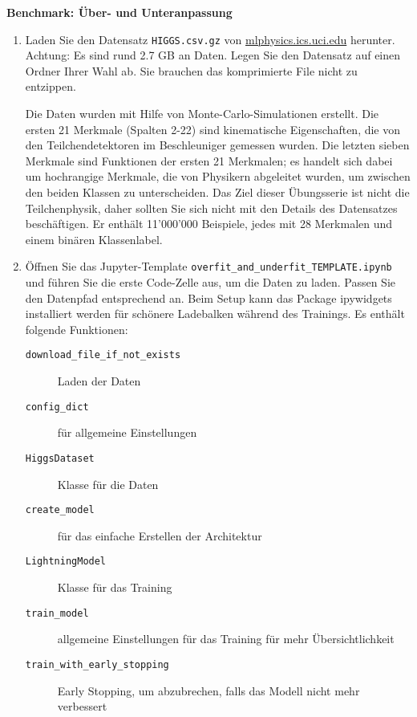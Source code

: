 \documentclass[11pt,a4paper,headinclude]{scrartcl}
\begin{document}
\begin{Aufgabe} \textbf{Benchmark: Über- und Unteranpassung}
	\label{ex:preprocessing}

	
	\begin{enumerate}
		\item Laden Sie den Datensatz \texttt{HIGGS.csv.gz} von \href{http://mlphysics.ics.uci.edu/data/higgs/}{mlphysics.ics.uci.edu} herunter. Achtung: Es sind rund 2.7 GB an Daten. Legen Sie den Datensatz auf einen Ordner Ihrer Wahl ab. Sie brauchen das komprimierte File nicht zu entzippen.
		
		Die Daten wurden mit Hilfe von Monte-Carlo-Simulationen erstellt. Die ersten 21 Merkmale (Spalten 2-22) sind kinematische Eigenschaften, die von den Teilchendetektoren im Beschleuniger gemessen wurden. Die letzten sieben Merkmale sind Funktionen der ersten 21 Merkmalen; es handelt sich dabei um hochrangige Merkmale, die von Physikern abgeleitet wurden, um zwischen den beiden Klassen zu unterscheiden. Das Ziel dieser Übungsserie ist nicht die Teilchenphysik, daher sollten Sie sich nicht mit den Details des Datensatzes beschäftigen. Er enthält 11'000'000 Beispiele, jedes mit 28 Merkmalen und einem binären Klassenlabel.
		
				
		\item Öffnen Sie das Jupyter-Template \texttt{overfit\_and\_underfit\_TEMPLATE.ipynb} und führen Sie die erste Code-Zelle aus, um die Daten zu laden. Passen Sie den Datenpfad entsprechend an. Beim Setup kann das Package ipywidgets installiert werden für schönere Ladebalken während des Trainings. Es enthält folgende Funktionen:
		\begin{description}
			\item[\texttt{download\_file\_if\_not\_exists}] Laden der Daten
			\item[\texttt{config\_dict}] für allgemeine Einstellungen
			\item[\texttt{HiggsDataset}] Klasse für die Daten
			\item[\texttt{create\_model}] für das einfache Erstellen der Architektur
			\item[\texttt{LightningModel}] Klasse für das Training
			\item[\texttt{train\_model}] allgemeine Einstellungen für das Training für mehr Übersichtlichkeit
			\item[\texttt{train\_with\_early\_stopping}] Early Stopping, um abzubrechen, falls das Modell nicht mehr verbessert
		\end{description}
		

\end{enumerate}
\end{Aufgabe}
\end{document}
